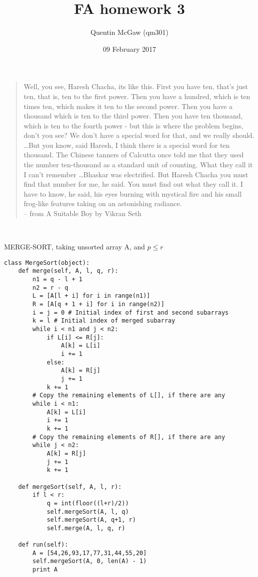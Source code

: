 \documentclass{article}
\title{FA homework 3}
\author{Quentin McGaw (qm301)}
\date{09 February 2017}
\begin{document}
\maketitle

\begin{quote}
Well, you see, Haresh Chacha, its like this.  First you have ten, that's
just ten, that is, ten to the first power.  Then you have a hundred, which
is ten times ten, which makes it ten to the second power.  Then you have a
thousand which is ten to the third power.  Then you have ten thousand,
which is ten to the fourth power - but this is where the problem begins,
don't you see?  We don't have a special word for that, and we really
should. \ldots  But you know, said Haresh, I think there is a special
word for ten thousand.  The Chinese tanners of Calcutta once told me that
they used the number ten-thousand as a standard unit of counting.  What
they call it I can't remember \ldots  Bhaskar was electrified.  But Haresh
Chacha you must find that number for me, he said.  You must find out what
they call it.  I have to know, he said, his eyes burning with mystical fire
and his small frog-like features taking on an astonishing radiance.
\\ -- from A Suitable Boy by Vikran Seth
\end{quote}

\begin{algorithm}[H]
    \Indm{} \\
    \Indp
    \caption{MERGE-SORT, taking unsorted array A, and $p \leq r$}
\end{algorithm}
\begin{verbatim}
class MergeSort(object):
    def merge(self, A, l, q, r):
        n1 = q - l + 1
        n2 = r - q
        L = [A[l + i] for i in range(n1)]
        R = [A[q + 1 + i] for i in range(n2)]
        i = j = 0 # Initial index of first and second subarrays
        k = l # Initial index of merged subarray
        while i < n1 and j < n2:
            if L[i] <= R[j]:
                A[k] = L[i]
                i += 1
            else:
                A[k] = R[j]
                j += 1
            k += 1
        # Copy the remaining elements of L[], if there are any
        while i < n1:
            A[k] = L[i]
            i += 1
            k += 1
        # Copy the remaining elements of R[], if there are any
        while j < n2:
            A[k] = R[j]
            j += 1
            k += 1

    def mergeSort(self, A, l, r):
        if l < r:
            q = int(floor((l+r)/2))
            self.mergeSort(A, l, q)
            self.mergeSort(A, q+1, r)
            self.merge(A, l, q, r)
            
    def run(self):
        A = [54,26,93,17,77,31,44,55,20]
        self.mergeSort(A, 0, len(A) - 1)
        print A
\end{verbatim}
    
\end{document}

